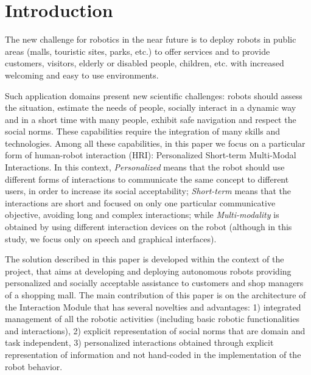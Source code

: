 \section{Introduction}
\vspace{-0.1cm}

The new challenge for robotics in the near future is to deploy robots in public areas (malls, touristic sites, parks, etc.) to offer services and to provide customers, visitors, elderly or disabled people, children, etc.  with increased welcoming and easy to use environments. 

Such application domains present new scientific challenges: robots should assess the situation, estimate the needs of people, socially interact in a dynamic way and in a short time with many people, exhibit safe navigation and respect the social norms. These capabilities require the integration of many skills and technologies.
Among all these capabilities, in this paper we focus on a particular form of human-robot interaction (HRI):
Personalized Short-term Multi-Modal Interactions.
In this context, \emph{Personalized} means that the robot should use different forms of interactions to communicate the same concept to different users, in order to increase its social acceptability;
\emph{Short-term} means that the interactions are short and focused on only one particular communicative objective, avoiding long and complex interactions; while
\emph{Multi-modality} is obtained by using different interaction devices on the robot (although in this study, we focus only on speech and graphical interfaces).

The solution described in this paper is developed within the context of the {\coaches}  project, 
that aims at developing and deploying autonomous robots providing personalized and socially acceptable assistance to customers and shop managers of a shopping mall.
The main contribution of this paper is on the architecture of the Interaction Module that has several novelties and advantages: 1) integrated management of all the robotic activities (including basic robotic functionalities and interactions), 2) explicit representation of social norms that are domain and task independent, 3) personalized interactions obtained through explicit representation of information and not hand-coded in the implementation of the robot behavior.

